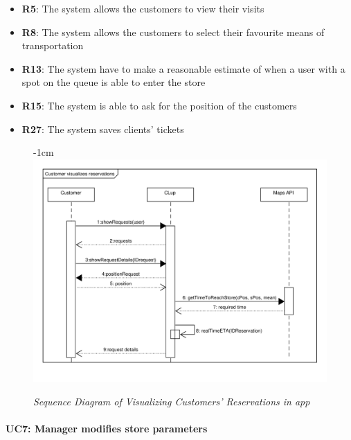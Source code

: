 \documentclass{article}
\begin{document}
\begin{center}
					\newpage
					
					\begin{itemize}
					\bigskip
					\bigskip
					\bigskip
					 {\bfseries Required functional requirements: }


					\item {\bfseries R5}: The system allows the customers to view their visits
					\item {\bfseries R8}: The system allows the customers to select their favourite means of transportation
					\item {\bfseries R13}: The system have to make a reasonable estimate of when a user with a spot on the queue is able to enter the store
					\item {\bfseries R15}: The system is able to ask for the position of the customers
					\item {\bfseries R27}: The system saves clients' tickets

					
					\end{itemize}
				\end{center}
					\begin{figure}
						\begin{adjustwidth} {-1cm}{}
							\centering
							\includegraphics[scale=0.65]{SD/6_visualizeReservation.pdf}\\
							\caption{\emph{Sequence Diagram of Visualizing Customers' Reservations in app}}
						\end{adjustwidth}
					\end{figure}
			\newpage
			\paragraph{UC7: Manager modifies store parameters}
			
\end{document}
